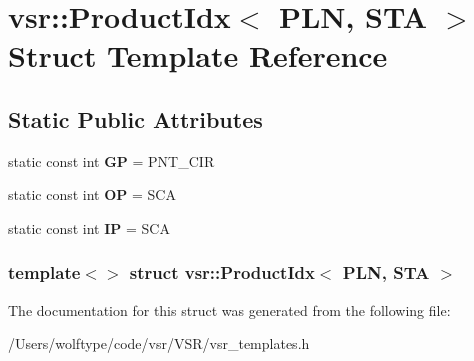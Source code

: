\hypertarget{structvsr_1_1_product_idx_3_01_p_l_n_00_01_s_t_a_01_4}{\section{vsr\-:\-:Product\-Idx$<$ P\-L\-N, S\-T\-A $>$ Struct Template Reference}
\label{structvsr_1_1_product_idx_3_01_p_l_n_00_01_s_t_a_01_4}
}
\subsection*{Static Public Attributes}
\begin{DoxyCompactItemize}
\item 
\hypertarget{structvsr_1_1_product_idx_3_01_p_l_n_00_01_s_t_a_01_4_aed7855ed3f9f5c71685f364f349da8e8}{static const int {\bfseries G\-P} = P\-N\-T\-\_\-\-C\-I\-R}\label{structvsr_1_1_product_idx_3_01_p_l_n_00_01_s_t_a_01_4_aed7855ed3f9f5c71685f364f349da8e8}

\item 
\hypertarget{structvsr_1_1_product_idx_3_01_p_l_n_00_01_s_t_a_01_4_a0d62cdd8bf674faad5a18385fd357a66}{static const int {\bfseries O\-P} = S\-C\-A}\label{structvsr_1_1_product_idx_3_01_p_l_n_00_01_s_t_a_01_4_a0d62cdd8bf674faad5a18385fd357a66}

\item 
\hypertarget{structvsr_1_1_product_idx_3_01_p_l_n_00_01_s_t_a_01_4_a491ef460712ba4a198b0ed187acecca0}{static const int {\bfseries I\-P} = S\-C\-A}\label{structvsr_1_1_product_idx_3_01_p_l_n_00_01_s_t_a_01_4_a491ef460712ba4a198b0ed187acecca0}

\end{DoxyCompactItemize}
\subsubsection*{template$<$$>$ struct vsr\-::\-Product\-Idx$<$ P\-L\-N, S\-T\-A $>$}



The documentation for this struct was generated from the following file\-:\begin{DoxyCompactItemize}
\item 
/\-Users/wolftype/code/vsr/\-V\-S\-R/vsr\-\_\-templates.\-h\end{DoxyCompactItemize}
